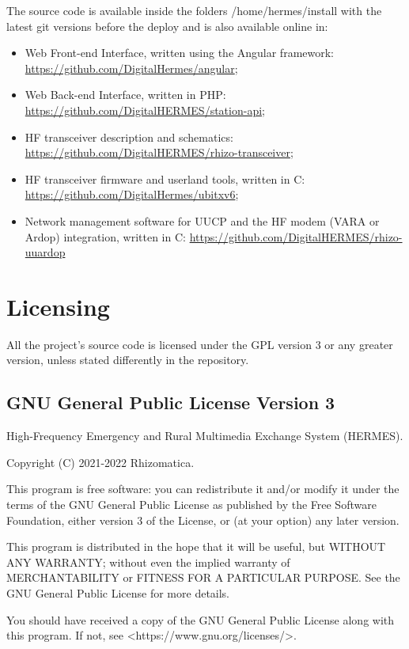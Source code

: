 \documentclass[11pt,a4paper]{article}
\begin{document}
    The source code is available inside the folders /home/hermes/install with the latest git versions before the deploy and is also available online in:
\begin{itemize}
    \item Web Front-end Interface, written using the Angular framework: \url{https://github.com/DigitalHermes/angular};
    \item Web Back-end Interface, written in PHP: \url{https://github.com/DigitalHERMES/station-api}; 
    \item HF transceiver description and schematics: \url{https://github.com/DigitalHERMES/rhizo-transceiver};
    \item HF transceiver firmware and userland tools, written in C:
    \url{https://github.com/DigitalHermes/ubitxv6};
    \item Network management software for UUCP and the HF modem (VARA or Ardop) integration, written in C:
    \url{https://github.com/DigitalHERMES/rhizo-uuardop}
\end{itemize}


\section{Licensing}
\label{apx_license}

    All the project's source code is licensed under the GPL version 3 or any greater version, unless stated differently in the repository.

\subsection{GNU General Public License Version 3}

    High-Frequency Emergency and Rural Multimedia Exchange System (HERMES).

    Copyright (C) 2021-2022 Rhizomatica.
\newline

    This program is free software: you can redistribute it and/or modify
    it under the terms of the GNU General Public License as published by
    the Free Software Foundation, either version 3 of the License, or
    (at your option) any later version.

    This program is distributed in the hope that it will be useful,
    but WITHOUT ANY WARRANTY; without even the implied warranty of
    MERCHANTABILITY or FITNESS FOR A PARTICULAR PURPOSE.  See the
    GNU General Public License for more details.

    You should have received a copy of the GNU General Public License
    along with this program.  If not, see <https://www.gnu.org/licenses/>.
\end{document}
